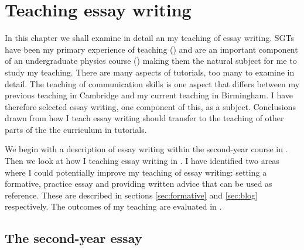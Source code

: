 \chapter{Teaching essay writing}\label{ch:essay}

In this chapter we shall examine in detail an my teaching of essay writing. SGTs have been my primary experience of teaching () and are an important component of an undergraduate physics course () making them the natural subject for me to study my teaching. There are many aspects of tutorials, too many to examine in detail. The teaching of communication skills is one aspect that differs between my previous teaching in Cambridge and my current teaching in Birmingham. I have therefore selected essay writing, one component of this, as a subject. Conclusions drawn from how I teach essay writing should transfer to the teaching of other parts of the the curriculum in tutorials.

We begin with a description of essay writing within the second-year course in . Then we look at how I teaching essay writing in . I have identified two areas where I could potentially improve my teaching of essay writing: setting a formative, practice essay and providing written advice that can be used as reference. These are described in sections \ref{sec:formative} and \ref{sec:blog} respectively. The outcomes of my teaching are evaluated in .

\section{The second-year essay}\label{sec:problem}


